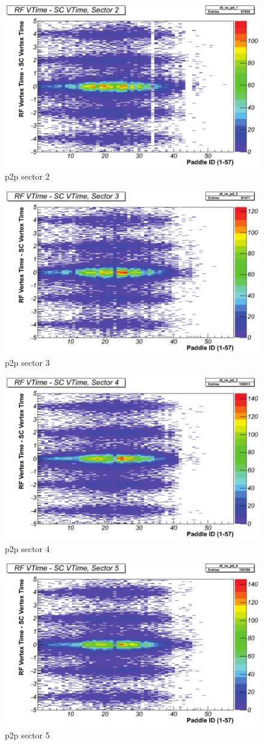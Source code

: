 \begin{figure}\begin{center}
    \includegraphics[width=.40\linewidth]{figures/calib/tof/Tof_56855_final_s2p2p.pdf}
    \caption{p2p sector 2}
    \label{plt:tofsec2}
\end{center}\end{figure}

\begin{figure}\begin{center}
    \includegraphics[width=.40\linewidth]{figures/calib/tof/Tof_56855_final_s3p2p.pdf}
    \caption{p2p sector 3}
    \label{plt:tofsec3}
\end{center}\end{figure}

\begin{figure}\begin{center}
    \includegraphics[width=.40\linewidth]{figures/calib/tof/Tof_56855_final_s4p2p.pdf}
    \caption{p2p sector 4}
    \label{plt:tofsec4}
\end{center}\end{figure}

\begin{figure}\begin{center}
    \includegraphics[width=.40\linewidth]{figures/calib/tof/Tof_56855_final_s5p2p.pdf}
    \caption{p2p sector 5}
    \label{plt:tofsec5}
\end{center}\end{figure}

